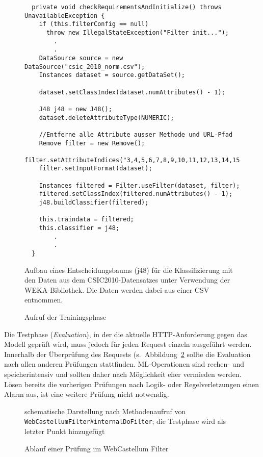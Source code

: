\begin{figure}[h]
  \centering
  \begin{lstlisting}
  private void checkRequirementsAndInitialize() throws UnavailableException {
    if (this.filterConfig == null)
      throw new IllegalStateException("Filter init...");
        .
        .
    DataSource source = new DataSource("csic_2010_norm.csv");
    Instances dataset = source.getDataSet();
                       
    dataset.setClassIndex(dataset.numAttributes() - 1);

    J48 j48 = new J48();
    dataset.deleteAttributeType(NUMERIC);

    //Entferne alle Attribute ausser Methode und URL-Pfad
    Remove filter = new Remove();
    filter.setAttributeIndices("3,4,5,6,7,8,9,10,11,12,13,14,15,16,17");
    filter.setInputFormat(dataset);

    Instances filtered = Filter.useFilter(dataset, filter);
    filtered.setClassIndex(filtered.numAttributes() - 1);
    j48.buildClassifier(filtered);

    this.traindata = filtered;
    this.classifier = j48;
        .
        .
  }
\end{lstlisting}
\caption{Aufruf der Trainingsphase}
\medskip
\small
Aufbau eines Entscheidungsbaums (j48) für die Klassifizierung mit den Daten aus dem CSIC2010-Datensatzes unter Verwendung der WEKA-Bibliothek. Die Daten werden dabei aus einer CSV entnommen.
\label{fig:wekatrain}

\end{figure}


Die Testphase (\emph{Evaluation}), in der die aktuelle HTTP-Anforderung gegen das Modell geprüft wird, muss jedoch für jeden Request einzeln ausgeführt werden. Innerhalb der Überprüfung des Requests (s.~Abbildung~\ref{fig:wcfilter} sollte die Evaluation nach allen anderen Prüfungen stattfinden. ML-Operationen sind rechen- und speicherintensiv und sollten daher nach Möglichkeit eher vermieden werden. Lösen bereits die vorherigen Prüfungen nach Logik- oder Regelverletzungen einen Alarm aus, ist eine weitere Prüfung nicht notwendig.

\begin{figure}[h]
  \centering
  
  \caption{Ablauf einer Prüfung im WebCastellum Filter}
  \label{fig:wcfilter}
  \medskip
  \small
  schematische Darstellung nach Methodenaufruf von \verb=WebCastellumFilter#internalDoFilter=; die Testphase wird als letzter Punkt hinzugefügt
\end{figure}

